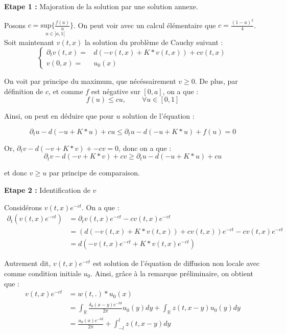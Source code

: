 \documentclass{article}
\begin{document}
\noindent \textbf{Etape 1 :} Majoration de la solution par une solution annexe.

Posons $c = \underset{u \in ]a,1[}{\text{sup} \{\frac{f(u)}{u}}\}$. On peut voir avec un calcul élémentaire que $  c = \frac{(1-a)^2}{4} $. Soit maintenant $v(t,x)$ la solution du problème de Cauchy suivant : 
\begin{equation*}
\left\{
  \begin{array}{cc}
    \partial_t v(t,x) =& d(-v(t,x) + K*v(t,x)) + cv(t,x) \\
    v(0,x) =& u_0(x) 
  \end{array}
  \right.
\end{equation*}

On voit par principe du maximum, que nécéssairement $v\ge 0$. De plus, par définition de $c$, et comme $f$ est négative sur $[0,a]$, on a que : 
\begin{equation*}
f(u) \le cu, ~~~~~~~~~~\forall u \in [0,1]
\end{equation*}

Ainsi, on peut en déduire que pour $u$ solution de l'équation : 

\begin{equation*}
\partial_t u - d(-u+K*u) +cu \le \partial_t u - d(-u+K*u) +f(u) = 0 
\end{equation*}

Or, $\partial_t v - d(-v + K*v)+- cv = 0$, donc on a que : 
\begin{equation*}
\partial_t v- d(-v + K*v) +cv \ge \partial_t u - d(-u+K*u) +cu 
\end{equation*}

et donc $v \ge u$ par principe de comparaison.\newline 

\noindent \textbf{Etape 2 :} Identification de $v$

Considérons $v(t,x) e^{-ct}$. On a que :
\begin{equation*}
\begin{split}
\partial_t(v(t,x) e^{-ct}) & = \partial_t v(t,x) e^{-ct} - c v(t,x)e^{-ct} \\
& = (d(-v(t,x) + K*v(t,x)) + cv(t,x))e^{-ct}  - c v(t,x)e^{-ct} \\
& = d(-v(t,x)e^{-ct} + K*v(t,x)e^{-ct})
\end{split}
\end{equation*}

Autrement dit, $v(t,x) e^{-ct}$ est solution de l'équation de diffusion non locale avec comme condition initiale $u_0$. Ainsi, grâce à la remarque préliminaire, on obtient que : 
\begin{equation*}
\begin{split}
  v(t,x) e^{-ct}& = w(t,.)*u_0(x)\\
  & = \int_{\mathbb{R}}\frac{\delta_0(x-y)e^{-td}}{2\pi}u_0(y)dy + \int_{\mathbb{R}}z(t,x-y)u_0(y)dy \\
  & = \frac{u_0(x)e^{-td}}{2\pi} + \int_{-l}^l z(t,x-y)dy
\end{split}
\end{equation*}
\end{document}
